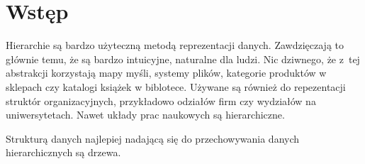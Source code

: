 \chapter{Wstęp}









Hierarchie są bardzo użyteczną metodą reprezentacji danych.
Zawdzięczają to głównie temu, że są bardzo intuicyjne, naturalne dla ludzi.
Nic dziwnego, że z~tej abstrakcji korzystają mapy myśli, systemy plików, kategorie produktów w sklepach czy katalogi książek w biblotece.
Używane są również do repezentacji struktór organizacyjnych, przykładowo odziałów firm czy wydziałów na uniwersytetach.
Nawet układy prac naukowych są hierarchiczne.



Strukturą danych najlepiej nadającą się do przechowywania danych hierarchicznych są drzewa.




